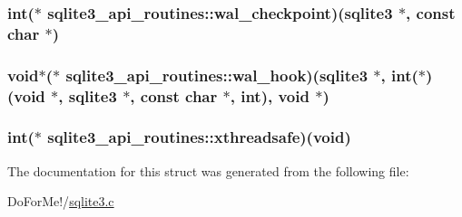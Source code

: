 \hypertarget{structsqlite3__api__routines_a8161479d3298a910a21e9d6dd92e1083}{
\subsubsection[{wal\-\_\-checkpoint}]{\setlength{\rightskip}{0pt plus 5cm}int($\ast$ sqlite3\-\_\-api\-\_\-routines\-::wal\-\_\-checkpoint)({\bf sqlite3} $\ast$, const char $\ast$)}}\label{structsqlite3__api__routines_a8161479d3298a910a21e9d6dd92e1083}
\hypertarget{structsqlite3__api__routines_ad2420d28d695f23941f69e53777819a9}{
\subsubsection[{wal\-\_\-hook}]{\setlength{\rightskip}{0pt plus 5cm}void$\ast$($\ast$ sqlite3\-\_\-api\-\_\-routines\-::wal\-\_\-hook)({\bf sqlite3} $\ast$, int($\ast$)(void $\ast$, {\bf sqlite3} $\ast$, const char $\ast$, int), void $\ast$)}}\label{structsqlite3__api__routines_ad2420d28d695f23941f69e53777819a9}
\hypertarget{structsqlite3__api__routines_ab3607e01452a88c8bd0251cf732ff796}{
\subsubsection[{xthreadsafe}]{\setlength{\rightskip}{0pt plus 5cm}int($\ast$ sqlite3\-\_\-api\-\_\-routines\-::xthreadsafe)(void)}}\label{structsqlite3__api__routines_ab3607e01452a88c8bd0251cf732ff796}


The documentation for this struct was generated from the following file\-:\begin{DoxyCompactItemize}
\item 
Do\-For\-Me!/\hyperlink{sqlite3_8c}{sqlite3.\-c}\end{DoxyCompactItemize}
